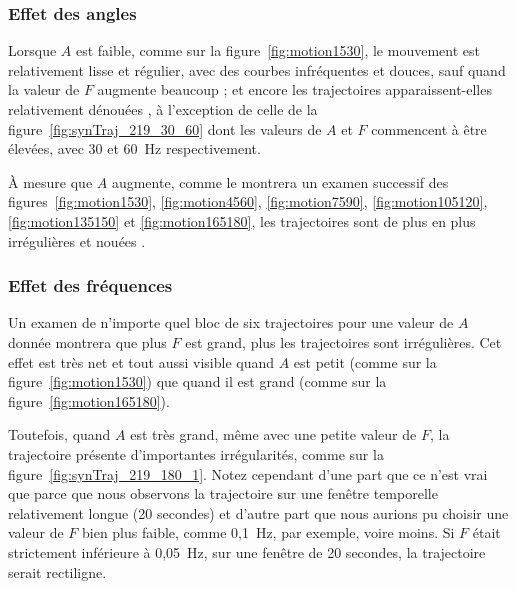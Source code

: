 	\FloatBarrier \subsubsection{Effet des angles}
	Lorsque $A$ est faible, comme sur la figure~\ref{fig:motion1530}, le mouvement est relativement lisse et régulier, avec des courbes infréquentes et douces, sauf quand la valeur de $F$ augmente beaucoup ; et encore les trajectoires apparaissent-elles relativement \og dénouées \fg{}, à l'exception de celle de la figure~\ref{fig:synTraj_219_30_60} dont les valeurs de $A$ et $F$ commencent à être élevées, avec 30\textdegree{} et 60~Hz respectivement.
	
	À mesure que $A$ augmente, comme le montrera un examen successif des figures~\ref{fig:motion1530}, \ref{fig:motion4560}, \ref{fig:motion7590}, \ref{fig:motion105120}, \ref{fig:motion135150} et \ref{fig:motion165180}, les trajectoires sont de plus en plus irrégulières et \og nouées \fg{}.
	
	\FloatBarrier \subsubsection{Effet des fréquences}
	Un examen de n'importe quel bloc de six trajectoires pour une valeur de $A$ donnée montrera que plus $F$ est grand, plus les trajectoires sont irrégulières. Cet effet est très net et tout aussi visible quand $A$ est petit (comme sur la figure~\ref{fig:motion1530}) que quand il est grand (comme sur la figure~\ref{fig:motion165180}).
	
	Toutefois, quand $A$ est très grand, même avec une petite valeur de $F$, la trajectoire présente d'importantes irrégularités, comme sur la figure~\ref{fig:synTraj_219_180_1}. Notez cependant d'une part que ce n'est vrai que parce que nous observons la trajectoire sur une fenêtre temporelle relativement longue (20 secondes) et d'autre part que nous aurions pu choisir une valeur de $F$ bien plus faible, comme 0,1~Hz, par exemple, voire moins. Si $F$ était strictement inférieure à 0,05~Hz, sur une fenêtre de 20 secondes, la trajectoire serait rectiligne.
	
